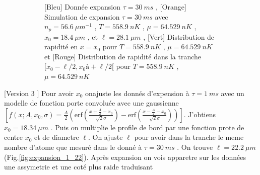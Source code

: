 \documentclass[a3, 10pt,twoside]{article}          %
\theoremstyle{plain}
\theoremstyle{definition}
\theoremstyle{remark}
\theoremstyle{definition} %
\def\OliveGreen{OliveGreen}
\begin{document}
\begin{figure}[h]
\begin{subfigure}[b]{0.45\textwidth}
        		\caption{{\color{blue}[Bleu] Donnée  expansion $\tau = 30~ms$} , {\color{orange}[Orange] Simulation de  expansion $\tau = 30~ms$ avec $n_p = 56.6 ~{\mu m}^{-1}$ , $T = 558.9 ~nK$ , $\mu= 64.529 ~nK$ , $x_0 = 18.4~\mu m$ , et $\ell = 28.1~\mu m$} ,  {\color{\OliveGreen}[Vert] Distribution de rapidité en $x = x_0$ pour  $T = 558.9 ~nK$ , $\mu= 64.529 ~nK$} et {\color{red}[Rouge] Distribution de rapidité dans la tranche  $[x_0 - \ell/2 , x_0à + \ell/2 [ $ pour  $T = 558.9 ~nK$ , $\mu= 64.529 ~nK$}}
        		\label{fig:expansion_30_28}
    		\end{subfigure}
    		\caption{}
			\label{}	
		\end{figure}
	
	[Version 3 ] 
	Pour avoir $x_0$  onajuste les donnés d'expension à $\tau = 1 ~ ms$ avec un modelle de fonction porte convoluée avec une gaussienne  $ \left [ f(x;A, x_0 , \sigma) = \frac{A}{2} \left ( \mbox{erf} \left (  \frac{x + \frac{A}2 - x_0 }{\sqrt{2} \sigma } \right ) - \mbox{erf} \left (  \frac{x - \frac{A}2 - x_0 }{\sqrt{2} \sigma } \right ) \right ) \right ] $. J'obtiens $x_0 = 18.34 ~\mu m$ . Puis on multiplie le profile de bord par une fonction prote de centre $x_0$ et de diametre $\ell$. On ajuste $\ell$ pour avoir dans la tranche le meme nombre d'atome que mesuré dans le donné à $\tau = 30~ms$ . On trouve $\ell = 22.2 ~\mu m $ (Fig.\ref{fig:expansion_1_22}). Après expansion on vois apparetre sur les données une assymetrie et une coté plus raide traduisant  
	
\end{document}
